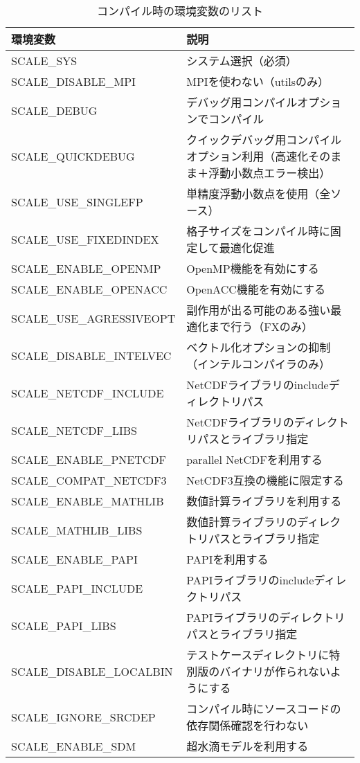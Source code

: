 \begin{table}[htb]
\begin{center}
\caption{コンパイル時の環境変数のリスト}
\begin{tabularx}{150mm}{|l|X|} \hline
 \rowcolor[gray]{0.9} 環境変数 & 説明  \\ \hline
 SCALE\_SYS               & システム選択（必須）  \\ \hline
 SCALE\_DISABLE\_MPI      & MPIを使わない（utilsのみ）  \\ \hline
 SCALE\_DEBUG             & デバッグ用コンパイルオプションでコンパイル  \\ \hline
 SCALE\_QUICKDEBUG        & クイックデバッグ用コンパイルオプション利用（高速化そのまま＋浮動小数点エラー検出）  \\ \hline
 SCALE\_USE\_SINGLEFP     & 単精度浮動小数点を使用（全ソース）  \\ \hline
 SCALE\_USE\_FIXEDINDEX   & 格子サイズをコンパイル時に固定して最適化促進  \\ \hline
 SCALE\_ENABLE\_OPENMP    & OpenMP機能を有効にする  \\ \hline
 SCALE\_ENABLE\_OPENACC   & OpenACC機能を有効にする  \\ \hline
 SCALE\_USE\_AGRESSIVEOPT & 副作用が出る可能のある強い最適化まで行う（FXのみ）  \\ \hline
 SCALE\_DISABLE\_INTELVEC & ベクトル化オプションの抑制（インテルコンパイラのみ）  \\ \hline
 SCALE\_NETCDF\_INCLUDE   & NetCDFライブラリのincludeディレクトリパス  \\ \hline
 SCALE\_NETCDF\_LIBS      & NetCDFライブラリのディレクトリパスとライブラリ指定  \\ \hline
 SCALE\_ENABLE\_PNETCDF   & parallel NetCDFを利用する  \\ \hline
 SCALE\_COMPAT\_NETCDF3   & NetCDF3互換の機能に限定する  \\ \hline
 SCALE\_ENABLE\_MATHLIB   & 数値計算ライブラリを利用する  \\ \hline
 SCALE\_MATHLIB\_LIBS     & 数値計算ライブラリのディレクトリパスとライブラリ指定  \\ \hline
 SCALE\_ENABLE\_PAPI      & PAPIを利用する  \\ \hline
 SCALE\_PAPI\_INCLUDE     & PAPIライブラリのincludeディレクトリパス  \\ \hline
 SCALE\_PAPI\_LIBS        & PAPIライブラリのディレクトリパスとライブラリ指定  \\ \hline
 SCALE\_DISABLE\_LOCALBIN & テストケースディレクトリに特別版のバイナリが作られないようにする  \\ \hline
 SCALE\_IGNORE\_SRCDEP    & コンパイル時にソースコードの依存関係確認を行わない  \\ \hline
 SCALE\_ENABLE\_SDM       & 超水滴モデルを利用する   \\ \hline
\end{tabularx}
\label{tab:env_var_list}
\end{center}
\end{table}

